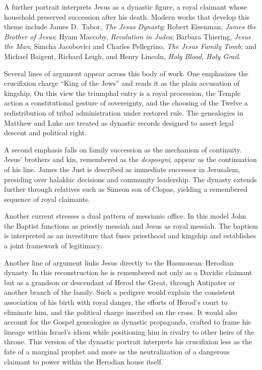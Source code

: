 A further portrait interprets Jesus as a dynastic figure, a royal claimant whose household preserved succession after his death.
Modern works that develop this theme include James D.\ Tabor, \emph{The Jesus Dynasty}; Robert Eisenman, \emph{James the Brother of Jesus}; Hyam Maccoby, \emph{Revolution in Judea}; Barbara Thiering, \emph{Jesus the Man}; Simcha Jacobovici and Charles Pellegrino, \emph{The Jesus Family Tomb}; and Michael Baigent, Richard Leigh, and Henry Lincoln, \emph{Holy Blood, Holy Grail}.

Several lines of argument appear across this body of work.
One emphasizes the crucifixion charge ``King of the Jews'' and reads it as the plain accusation of kingship.
On this view the triumphal entry is a royal procession, the Temple action a constitutional gesture of sovereignty, and the choosing of the Twelve a redistribution of tribal administration under restored rule.
The genealogies in Matthew and Luke are treated as dynastic records designed to assert legal descent and political right.

A second emphasis falls on family succession as the mechanism of continuity.
Jesus’ brothers and kin, remembered as the \emph{desposyni}, appear as the continuation of his line.
James the Just is described as immediate successor in Jerusalem, presiding over halakhic decisions and community leadership.
The dynasty extends further through relatives such as Simeon son of Clopas, yielding a remembered sequence of royal claimants.

Another current stresses a dual pattern of messianic office.
In this model John the Baptist functions as priestly messiah and Jesus as royal messiah.
The baptism is interpreted as an investiture that fuses priesthood and kingship and establishes a joint framework of legitimacy.

Another line of argument links Jesus directly to the Hasmonean–Herodian dynasty.
In this reconstruction he is remembered not only as a Davidic claimant but as a grandson or descendant of Herod the Great, through Antipater or another branch of the family.
Such a pedigree would explain the consistent association of his birth with royal danger, the efforts of Herod’s court to eliminate him, and the political charge inscribed on the cross.
It would also account for the Gospel genealogies as dynastic propaganda, crafted to frame his lineage within Israel’s idiom while positioning him in rivalry to other heirs of the throne.
This version of the dynastic portrait interprets his crucifixion less as the fate of a marginal prophet and more as the neutralization of a dangerous claimant to power within the Herodian house itself.

